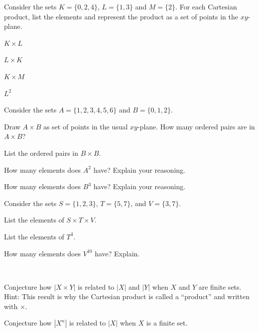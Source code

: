 \begin{exer}[\exerP] %
\label{exer_cart_prod_2sets}
    Consider the sets $K = \{0, 2, 4\}$, $L = \{1,3\}$ and $M = \{2\}$.  For each Cartesian product, list the elements and represent the product as a set of points in the $xy$-plane.
        \begin{exerpart}
            \item $K \times L$
            \item $L \times K$
            \item $K \times M$
            \item $L^2$
        \end{exerpart}
\end{exer}

\begin{exer}[\exerP] %
\label{exer_cart_prod_count}
    Consider the sets $A = \{1, 2, 3, 4, 5, 6\}$ and $B = \{0, 1, 2\}$.   
        \begin{exerpart}
            \item Draw $A \times B$ as set of points in the usual $xy$-plane.  How many ordered pairs are in $A \times B$?
            \item List the ordered pairs in $B \times B$.  
            \item How many elements does $A^2$ have?  Explain your reasoning.
            \item How many elements does $B^3$ have? Explain your reasoning.
        \end{exerpart}
\end{exer}

\begin{exer}[\exerP] %
\label{exer_cart_prod_morethan2_sets}
    Consider the sets $S = \{1,2,3\}$, $T = \{5,7\}$, and $V = \{3,7\}$.
        \begin{exerpart}
            \item List the elements of $S \times T \times V$.
            \item List the elements of $T^3$.
            \item How many elements does $V^{10}$ have? Explain.
        \end{exerpart}
\end{exer}

\begin{exer}[\exerU] %
\label{exer_cart_prod_order_formula}
~
    \begin{exerpart}
        \item Conjecture how $|X \times Y|$ is related to $|X|$ and $|Y|$ when $X$ and $Y$ are finite sets. Hint: This result is why the Cartesian product is called a ``product'' and written with $\times$.
        \item Conjecture how $|X^n|$ is related to $|X|$ when $X$ is a finite set.
    \end{exerpart}
\end{exer}

